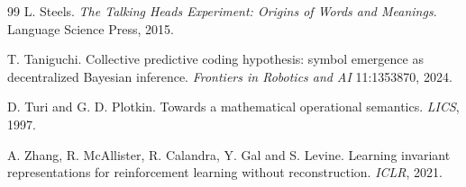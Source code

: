 \documentclass[11pt,a4paper]{article}
\theoremstyle{definition}
\theoremstyle{plain}
\theoremstyle{remark}
\begin{document}
\begin{thebibliography}{99}
 L. Steels. \emph{The Talking Heads Experiment: Origins of Words and
Meanings}. Language Science Press, 2015.

 T. Taniguchi. Collective predictive coding hypothesis: symbol
emergence as decentralized Bayesian inference. \emph{Frontiers in Robotics and AI}
11:1353870, 2024.

 D. Turi and G. D. Plotkin. Towards a mathematical operational
semantics. \emph{LICS}, 1997.

 A. Zhang, R. McAllister, R. Calandra, Y. Gal and S. Levine. Learning
invariant representations for reinforcement learning without reconstruction. \emph{ICLR},
2021.

\end{thebibliography}
\end{document}

